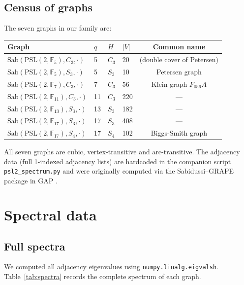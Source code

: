 \documentclass[11pt,a4paper]{amsart}
\theoremstyle{definition}
\theoremstyle{remark}
\newcommand{\PSL}[1]{\mathrm{PSL}(2,\mathbb{F}_{#1})}
\newcommand{\Sab}{\mathrm{Sab}}
\begin{document}
\subsection{Census of graphs}

The seven graphs in our family are:

\medskip
\begin{center}
\begin{tabular}{llllc}
\toprule
Graph & $q$ & $H$ & $|V|$ & Common name \\
\midrule
$\Sab(\PSL{5}, C_3, \cdot)$ & 5 & $C_3$ & 20 & (double cover of Petersen) \\
$\Sab(\PSL{5}, S_3, \cdot)$ & 5 & $S_3$ & 10 & Petersen graph \\
$\Sab(\PSL{7}, C_3, \cdot)$ & 7 & $C_3$ & 56 & Klein graph $F_{056}A$ \\
$\Sab(\PSL{11}, C_3, \cdot)$ & 11 & $C_3$ & 220 & --- \\
$\Sab(\PSL{13}, S_3, \cdot)$ & 13 & $S_3$ & 182 & --- \\
$\Sab(\PSL{17}, S_3, \cdot)$ & 17 & $S_3$ & 408 & --- \\
$\Sab(\PSL{17}, S_4, \cdot)$ & 17 & $S_4$ & 102 & Biggs-Smith graph \\
\bottomrule
\end{tabular}
\end{center}
\medskip

\noindent
All seven graphs are cubic, vertex-transitive and arc-transitive.  The
adjacency data (full 1-indexed adjacency lists) are hardcoded in the companion
script \texttt{psl2\_spectrum.py} and were originally computed via the
Sabidussi--GRAPE package in GAP \cite{GRAPE}.

\section{Spectral data}

\subsection{Full spectra}

We computed all adjacency eigenvalues using \texttt{numpy.linalg.eigvalsh}.
Table~\ref{tab:spectra} records the complete spectrum of each graph.
\end{document}

